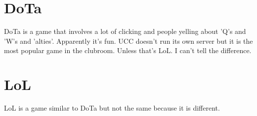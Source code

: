 \section{DoTa}
DoTa is a game that involves a lot of clicking and people yelling about 'Q's and 'W's and 'alties'. Apparently it's fun. UCC doesn't run its own server but it is the most popular game in the clubroom. Unless that's LoL. I can't tell the difference.

\section{LoL}
LoL is a game similar to DoTa but not the same because it is different.
